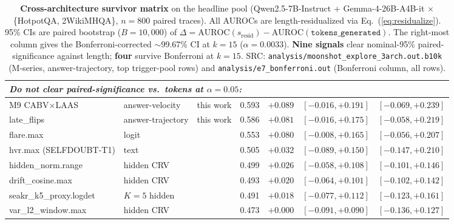 \documentclass[11pt]{article}
\begin{document}
\begin{table}[t]
\begin{tabular}{@{}lllrcll@{}}
\midrule
\multicolumn{7}{l}{\textit{Do not clear paired-significance vs.\ tokens at $\alpha=0.05$:}} \\
\midrule
M9 CABV$\times$LAAS       & answer-velocity & this work                     & 0.593 & $+0.089$ & $[-0.016, +0.191]$ & $[-0.069, +0.239]$ \\
late\_flips           & answer-trajectory & this work                   & 0.586 & $+0.081$ & $[-0.016, +0.175]$ & $[-0.058, +0.219]$ \\
flare.max                 & logit          & \citep{Jiang_FLARE}            & 0.553 & $+0.080$ & $[-0.008, +0.165]$ & $[-0.056, +0.207]$ \\
hvr.max (SELFDOUBT-T1)    & text           & \citep{Kadavath_SelfDoubt}     & 0.505 & $+0.032$ & $[-0.089, +0.150]$ & $[-0.147, +0.210]$ \\
hidden\_norm.range        & hidden CRV     & \citep{Azaria_Mitchell_InternalState} & 0.499 & $+0.026$ & $[-0.058, +0.108]$ & $[-0.101, +0.146]$ \\
drift\_cosine.max         & hidden CRV     & \citep{Chen_INSIDE}            & 0.493 & $+0.020$ & $[-0.064, +0.101]$ & $[-0.102, +0.142]$ \\
seakr\_k5\_proxy.logdet   & $K{=}5$ hidden & \citep{Yao_SeaKR}              & 0.491 & $+0.018$ & $[-0.077, +0.112]$ & $[-0.123, +0.161]$ \\
var\_l2\_window.max       & hidden CRV     & \citep{Chen_INSIDE}            & 0.473 & $+0.000$ & $[-0.091, +0.090]$ & $[-0.136, +0.127]$ \\
\bottomrule
\end{tabular}
\caption{\textbf{Cross-architecture survivor matrix} on the headline pool
(Qwen2.5-7B-Instruct + Gemma-4-26B-A4B-it
$\times$ \{HotpotQA, 2WikiMHQA\}, $n{=}800$ paired traces). All AUROCs are
length-residualized via Eq.~(\ref{eq:residualize}). 95\% CIs are paired
bootstrap ($B{=}10{,}000$) of $\Delta = \mathrm{AUROC}(s_{\text{resid}}) -
\mathrm{AUROC}(\texttt{tokens\_generated})$. The right-most column gives the
Bonferroni-corrected $\sim$99.67\% CI at $k{=}15$ ($\alpha=0.0033$).
\textbf{Nine signals} clear nominal-95\% paired-significance against length;
\textbf{four} survive Bonferroni at $k{=}15$.
SRC: \texttt{analysis/moonshot\_explore\_3arch.out.b10k} (M-series,
answer-trajectory, top trigger-pool rows) and
\texttt{analysis/e7\_bonferroni.out} (Bonferroni column, all rows).}
\label{tab:hero}
\end{table}

\end{document}
